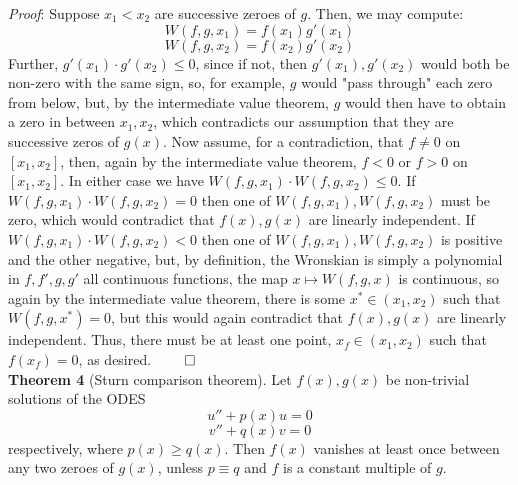 \documentclass[12pt]{article}
\begin{document}
\noindent \textit{Proof}: Suppose $x_1 < x_2$ are successive zeroes of $g$. Then, we may compute: $$W(f, g, x_1) = f(x_1)g'(x_1)$$ $$W(f, g, x_2) = f(x_2)g'(x_2)$$ Further, $g'(x_1) \cdot g'(x_2) \leq 0$, since if not, then $g'(x_1), g'(x_2)$ would both be non-zero with the same sign, so, for example, $g$ would "pass through" each zero from below, but, by the intermediate value theorem, $g$ would then have to obtain a zero in between $x_1, x_2$, which contradicts our assumption that they are successive zeros of $g(x)$. Now assume, for a contradiction, that $f \not= 0$ on $[x_1, x_2]$, then, again by the intermediate value theorem, $f < 0$ or $f > 0$ on $[x_1, x_2]$. In either case we have $W(f, g, x_1) \cdot W(f, g, x_2) \leq 0$. If $W(f, g, x_1) \cdot W(f, g, x_2) = 0$ then one of $W(f, g, x_1), W(f, g, x_2)$ must be zero, which would contradict that $f(x), g(x)$ are linearly independent. If $W(f, g, x_1) \cdot W(f, g, x_2)< 0$ then one of $W(f,g, x_1), W(f, g, x_2)$ is positive and the other negative, but, by definition, the Wronskian is simply a polynomial in $f, f', g, g'$ all continuous functions, the map $x \mapsto W(f, g, x)$ is continuous, so again by the intermediate value theorem, there is some $x^* \in (x_1, x_2)$ such that $W(f, g, x^*) = 0$, but this would again contradict that $f(x), g(x)$ are linearly independent. Thus, there must be at least one point, $x_f \in (x_1, x_2)$ such that $f(x_f) = 0$, as desired. $\qed$ \\

\noindent \textbf{Theorem 4} (Sturn comparison theorem). Let $f(x), g(x)$ be non-trivial solutions of the ODES $$u'' + p(x)u = 0$$ $$v'' + q(x)v = 0$$ respectively, where $p(x) \geq q(x)$. Then $f(x)$ vanishes at least once between any two zeroes of $g(x)$, unless $p \equiv q$ and $f$ is a constant multiple of $g$. \\
\end{document}
